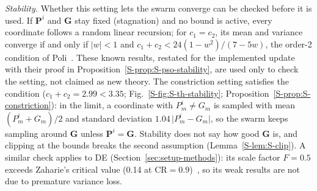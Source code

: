 \emph{Stability.} Whether this setting lets the swarm converge can be checked before it is used. If $\mathbf P^i$ and $\mathbf G$ stay fixed (stagnation) and no bound is active, every coordinate follows a random linear recursion; for $c_1=c_2$, its mean and variance converge if and only if $\lvert w\rvert<1$ and $c_1+c_2<24(1-w^2)/(7-5w)$, the order-2 condition of Poli~\cite{Poli2009,Bonyadi2017}. These known results, restated for the implemented update with their proof in Proposition~\ref{S-prop:S-pso-stability}, are used only to check the setting, not claimed as new theory. The constriction setting satisfies the condition ($c_1+c_2=2.99<3.35$; Fig.~\ref{S-fig:S-th-stability}; Proposition~\ref{S-prop:S-constriction}): in the limit, a coordinate with $P^i_m\ne G_m$ is sampled with mean $(P^i_m+G_m)/2$ and standard deviation $1.04\,\lvert P^i_m-G_m\rvert$, so the swarm keeps sampling around $\mathbf G$ unless $\mathbf P^i=\mathbf G$. Stability does not say how good $\mathbf G$ is, and clipping at the bounds breaks the second assumption (Lemma~\ref{S-lem:S-clip}).
A similar check applies to DE (Section~\ref{sec:setup-methods}): its scale factor $F=0.5$ exceeds Zaharie's critical value (0.14 at $\mathrm{CR}=0.9$)~\cite{Zaharie2002}, so its weak results are not due to premature variance loss.

